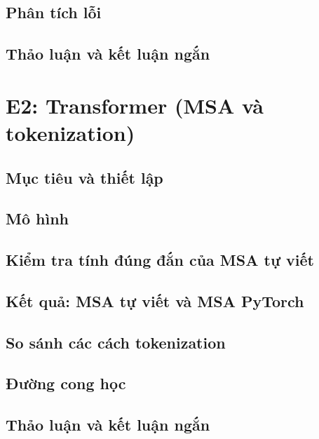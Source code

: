\documentclass[a4paper,12pt]{article}
\begin{document}
\subsection{Phân tích lỗi}
\subsection{Thảo luận và kết luận ngắn}

\section{E2: Transformer (MSA và tokenization)}
\label{sec:e2}
\subsection{Mục tiêu và thiết lập}
\subsection{Mô hình}
\subsection{Kiểm tra tính đúng đắn của MSA tự viết}
\subsection{Kết quả: MSA tự viết và MSA PyTorch}
\subsection{So sánh các cách tokenization}
\subsection{Đường cong học}
\subsection{Thảo luận và kết luận ngắn}
\end{document}
